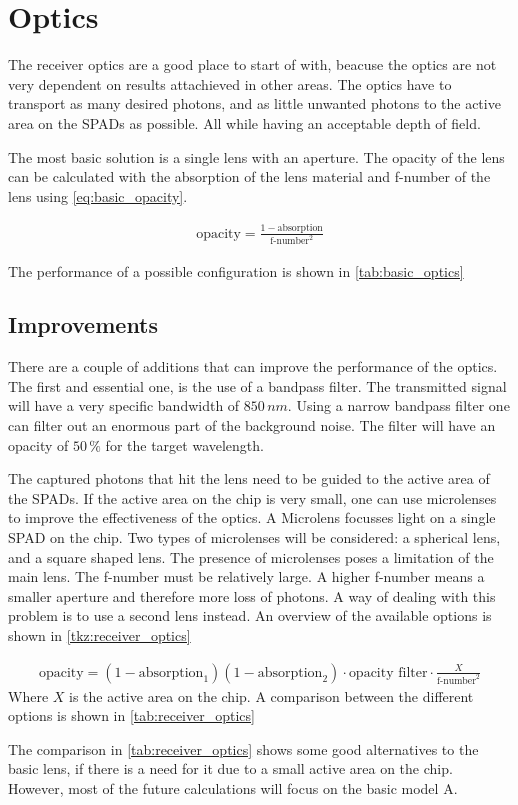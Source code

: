 \section{Optics}\label{ssec:optics}
The receiver optics are a good place to start of with, beacuse the optics are not very dependent on results attachieved in other areas. The optics have to transport as many desired photons, and as little unwanted photons to the active area on the SPADs as possible. All while having an acceptable depth of field. 

The most basic solution is a single lens with an aperture. The opacity of the lens can be calculated with the absorption of the lens material and f-number of the lens using \cref{eq:basic_opacity}.

\begin{align}\label{eq:basic_opacity}
\text{opacity} = \frac{1-\text{absorption}}{\text{f-number}^2}
\end{align}

 The performance of a possible configuration is shown in \cref{tab:basic_optics}



\subsection{Improvements}
There are a couple of additions that can improve the performance of the optics. The first and essential one, is the use of a bandpass filter. The transmitted signal will have a very specific bandwidth of $850\,nm$. Using a narrow bandpass filter one can filter out an enormous part of the background noise. The filter will have an opacity of $50\,\%$ for the target wavelength.

The captured photons that hit the lens need to be guided to the active area of the SPADs. If the active area on the chip is very small, one can use microlenses to improve the effectiveness of the optics. A Microlens focusses light on a single SPAD on the chip. Two types of microlenses will be considered: a spherical lens, and a square shaped lens. The presence of microlenses poses a limitation of the main lens. The f-number must be relatively large. A higher f-number means a smaller aperture and therefore more loss of photons. A way of dealing with this problem is to use a second lens instead. An overview of the available options is shown in \cref{tkz:receiver_optics}



\begin{align}
\text{opacity} = (1-\text{absorption}_1)(1-\text{absorption}_2)\cdot\text{opacity filter}\cdot \frac{X}{\text{f-number}^2}
\end{align}
Where $X$ is the active area on the chip. A comparison between the different options is shown in \cref{tab:receiver_optics}



The comparison in \cref{tab:receiver_optics} shows some good alternatives to the basic lens, if there is a need for it due to a small active area on the chip. However, most of the future calculations will focus on the basic model A.

